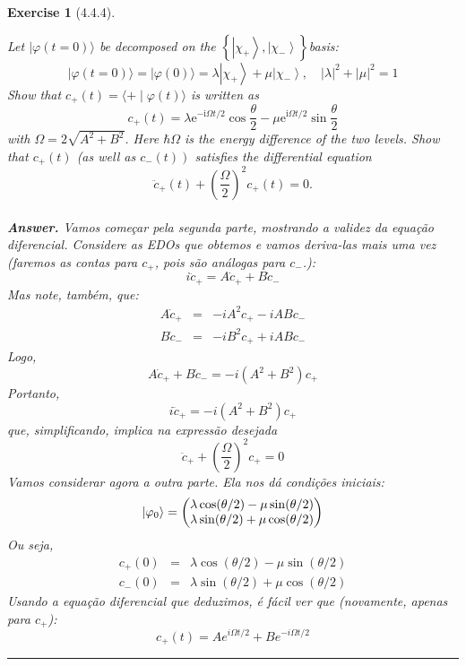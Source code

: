 \documentclass[12pt]{article}
\def\be{\begin{equation}}
\def\ee{\end{equation}}
\def\bea{\begin{eqnarray*}}
\def\eea{\end{eqnarray*}}
\def\f{\frac}
\def\l{\left}
\def\r{\right}
\newtheorem{exercise}{Exercise}
\newenvironment{multianswer}{\\ \noindent\textbf{\textit{Answer.}} \normalfont }{ \par\noindent\rule{0.7\textwidth}{0.1pt}}
\begin{document}
\begin{exercise}[4.4.4]
\begin{exercises}
		\item Let $|\varphi(t=0)\rangle$ be decomposed on the $\left\{\left|\chi_{+}\right\rangle,\left|\chi_{-}\right\rangle\right\}$basis:
		$$
		|\varphi(t=0)\rangle=|\varphi(0)\rangle=\lambda\left|\chi_{+}\right\rangle+\mu\left|\chi_{-}\right\rangle, \quad|\lambda|^{2}+|\mu|^{2}=1
		$$
		Show that $c_{+}(t)=\langle+\mid \varphi(t)\rangle$ is written as
		$$
		c_{+}(t)=\lambda \mathrm{e}^{-\mathrm{i} \Omega t / 2} \cos \frac{\theta}{2}-\mu \mathrm{e}^{\mathrm{i} \Omega t / 2} \sin \frac{\theta}{2}
		$$
		with $\Omega=2 \sqrt{A^{2}+B^{2}}$. Here $\hbar \Omega$ is the energy difference of the two levels. Show that $c_{+}(t)$ (as well as $\left.c_{-}(t)\right)$ satisfies the differential equation
		$$
		\ddot{c}_{+}(t)+\left(\frac{\Omega}{2}\right)^{2} c_{+}(t)=0 .
		$$
		\begin{multianswer}
			Vamos começar pela segunda parte, mostrando a validez da equação diferencial. Considere as EDOs que obtemos e vamos deriva-las mais uma vez (faremos as contas para $c_+$, pois são análogas para $c_-$.):
			\be
				i\ddot{c}_+ = A\dot{c}_+ + B\dot{c}_-
			\ee
			Mas note, também, que:
			\bea
				A\dot{c}_+ &=& -iA^2c_+ - iABc_- \\
				B\dot{c}_- &=& -iB^2c_+ + iABc_-
			\eea
			Logo, 
			\be
				A\dot{c}_+ + B\dot{c}_- = -i(A^2+B^2)c_+
			\ee
			Portanto,
			\be
				i\ddot{c}_+ = -i(A^2+B^2)c_+
			\ee
			que, simplificando, implica na expressão desejada
			\be
				\ddot{c}_+ +\l(\f{\Omega}{2}\r)^2c_+ = 0
			\ee
			Vamos considerar agora a outra parte. Ela nos dá condições iniciais:
			\be
				\ket{\varphi_0} = 
				\begin{pmatrix}
					\lambda\cos(\theta/2) - \mu\sin(\theta/2) \\
					\lambda\sin(\theta/2) + \mu\cos(\theta/2) \\
				\end{pmatrix}
			\ee
			Ou seja,
			\bea
				c_+(0) &=& \lambda\cos(\theta/2) - \mu\sin(\theta/2) \\
				c_-(0) &=& \lambda\sin(\theta/2) + \mu\cos(\theta/2) 
			\eea
			Usando a equação diferencial que deduzimos, é fácil ver que (novamente, apenas para $c_+$):
			\be
				c_+(t) = Ae^{i\Omega t/2} + Be^{-i\Omega t/2}
			\ee
			
			
		\end{multianswer}
		\end{exercises}
	\end{exercise}
	
	
\end{document}
